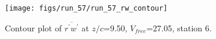 \begin{figure}[H]
\centering
\texttt{[image: figs/run\_57/run\_57\_rw\_contour]}
\caption{Contour plot of $\overline{r^\prime w^\prime}$ at $z/c$=9.50, $V_{free}$=27.05, station 6.}
\end{figure}


